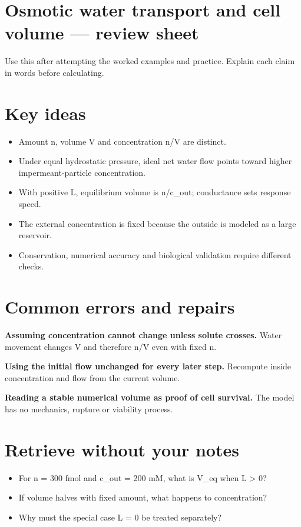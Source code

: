 \documentclass[11pt,letterpaper]{article}
\theoremstyle{definition}\newtheorem{definition}{Definition}\newtheorem{example}{Example}
\numberwithin{equation}{section}
\begin{document}
\section*{Osmotic water transport and cell volume --- review sheet}
Use this after attempting the worked examples and practice. Explain each claim in words before calculating.

\section*{Key ideas}
\begin{itemize}
\item Amount n, volume V and concentration n/V are distinct.
\item Under equal hydrostatic pressure, ideal net water flow points toward higher impermeant-particle concentration.
\item With positive L, equilibrium volume is n/c\_out; conductance sets response speed.
\item The external concentration is fixed because the outside is modeled as a large reservoir.
\item Conservation, numerical accuracy and biological validation require different checks.
\end{itemize}
\section*{Common errors and repairs}
\textbf{Assuming concentration cannot change unless solute crosses.} Water movement changes V and therefore n/V even with fixed n.

\textbf{Using the initial flow unchanged for every later step.} Recompute inside concentration and flow from the current volume.

\textbf{Reading a stable numerical volume as proof of cell survival.} The model has no mechanics, rupture or viability process.

\section*{Retrieve without your notes}
\begin{itemize}
\item For n =\allowbreak{} 300 fmol and c\_out =\allowbreak{} 200 mM, what is V\_eq when L > 0?
\item If volume halves with fixed amount, what happens to concentration?
\item Why must the special case L =\allowbreak{} 0 be treated separately?
\end{itemize}
\end{document}
